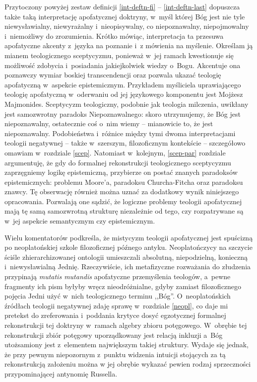 Przytoczony powyżej zestaw definicji \ref{int-deftn-fi} -- \ref{int-deftn-last} dopuszcza także taką interpretację apofatycznej doktryny, w~myśl której Bóg jest nie tyle niewysławialny, niewyrażalny i~nieopisywalny, co niepoznawalny, niepojmowalny i~niemożliwy do zrozumienia. Krótko mówiąc, interpretacja ta przesuwa apofatyczne akcenty z~języka na poznanie i~z mówienia na myślenie. Określam ją mianem teologicznego sceptycyzmu, ponieważ w~jej ramach kwestionuje się możliwość zdobycia i~posiadania jakiejkolwiek wiedzy o~Bogu. Akcentuje ona poznawczy wymiar boskiej transcendencji oraz pozwala ukazać teologię apofatyczną w~aspekcie epistemicznym. Przykładem myśliciela uprawiającego teologię apofatyczną w~oderwaniu od jej językowego komponentu jest Mojżesz Majmonides. Sceptycyzm teologiczny, podobnie jak teologia milczenia, uwikłany jest samozwrotny paradoks Niepoznawalnego: skoro utrzymujemy, że Bóg jest niepoznawalny, ostatecznie coś o~nim wiemy -- mianowicie to, że jest niepoznawalny. Podobieństwa i~różnice między tymi dwoma interpretacjami teologii negatywnej -- także w~szerszym, filozoficznym kontekście -- szczegółowo omawiam w~rozdziale \ref{scep}. Natomiast w~kolejnym, \ref{scep-par} rozdziale argumentuję, że gdy do formalnej rekonstrukcji teologicznego sceptycyzmu zaprzęgniemy logikę epistemiczną, przybierze on postać znanych paradoksów epistemicznych: problemu Moore'a, paradoksu Churcha-Fitcha oraz paradoksu znawcy. Tę obserwację również można uznać za dodatkowy wynik niniejszego opracowania. Pozwalają one sądzić, że logiczne problemy teologii apofatycznej mają tę samą samozwrotną strukturę niezależnie od tego, czy rozpatrywane są w~jej aspekcie semantycznym czy epistemicznym.

Wielu komentatorów podkreśla, że mistycyzm teologii apofatycznej jest spuścizną po neoplatońskiej szkole filozoficznej późnego antyku. Neoplatończycy na szczycie ściśle zhierarchizowanej ontologii umieszczali absolutną, niepodzielną, konieczną i~niewysławialną Jednię. Rzeczywiście, ich metafizyczne rozważania do złudzenia przypinają \textit{mutatis mutandis} apofatyczne przemyślenia teologów, a~pewne fragmenty ich pism byłyby wręcz nieodróżnialne, gdyby zamiast filozoficznego pojęcia Jedni użyć w~nich teologicznego terminu ,,Bóg''. O~neoplatońskich źródłach teologii negatywnej zdaję sprawę w~rozdziale \ref{neopl}, co daje mi pretekst do zreferowania i~poddania krytyce dosyć egzotycznej formalnej rekonstrukcji tej doktryny w~ramach algebry zbioru potęgowego. W~obrębie tej rekonstrukcji zbiór potęgowy uporządkowany jest relacją inkluzji a~Bóg utożsamiony jest z~elementem największym takiej struktury. Wydaje się jednak, że przy pewnym niepozornym z~punktu widzenia intuicji stojących za tą rekonstrukcją założeniu można w jej obrębie wykazać pewien rodzaj sprzeczności przypominającej antynomię Russella.

